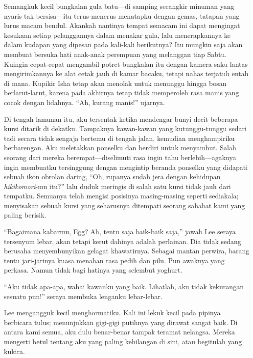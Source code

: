 \documentclass[smalldemyvopaper,11pt,twoside,onecolumn,openright,extrafontsizes]{memoir}
\begin{document}

Semangkuk kecil bungkalan gula batu---di samping secangkir minuman yang nyaris tak bersisa---itu terus-menerus menatapku dengan gemas, tatapan yang lurus macam bendul. Akankah nantinya tempat semacam ini dapat mengingat kesukaan setiap pelanggannya dalam menakar gula, lalu menerapkannya ke dalam kudapan yang dipesan pada kali-kali berikutnya? Itu mungkin saja akan membuat bersuka hati anak-anak perempuan yang melanggan tiap Sabtu. Kuingin cepat-cepat mengambil potret bungkalan itu dengan kamera saku lantas mengirimkannya ke alat cetak jauh di kamar bacaku, tetapi nahas terjatuh entah di mana. Kupikir Isha tetap akan menolak untuk menunggu hingga bosan berlarut-larut, karena pada akhirnya tetap tidak memperoleh rasa manis yang cocok dengan lidahnya. ``Ah, kurang manis!'' ujarnya.


Di tengah lamunan itu, aku tersentak ketika mendengar bunyi decit beberapa kursi ditarik di dekatku. Tampaknya kawan-kawan yang kutunggu-tunggu sedari tadi secara tidak sengaja bertemu di tengah jalan, kemudian menghampiriku berbarengan. Aku meletakkan ponselku dan berdiri untuk menyambut. Salah seorang dari mereka berempat---diselimuti rasa ingin tahu berlebih---agaknya ingin membuatku tersinggung dengan mengintip beranda ponselku yang didapati sebuah ikon obrolan daring, ``Oh, rupanya sudah jera dengan kehidupan \textit{hikikomori}-mu itu?'' lalu duduk meringis di salah satu kursi tidak jauh dari tempatku. Semuanya telah mengisi posisinya masing-masing seperti sediakala; menyisakan sebuah kursi yang seharusnya ditempati seorang sahabat kami yang paling berisik.

``Bagaimana kabarmu, Egg? Ah, tentu saja baik-baik saja,'' jawab Lee seraya tersenyum lebar, akan tetapi kerut dahinya adalah perlainan. Dia tidak sedang berusaha menyembunyikan gelagat khawatirnya. Sebagai mantan perwira, barang tentu jari-jarinya kuasa menahan rasa pedih dan pilu. Pun awaknya yang perkasa. Namun tidak bagi hatinya yang selembut yoghurt.

``Aku tidak apa-apa, wahai kawanku yang baik. Lihatlah, aku tidak kekurangan sesuatu pun!'' seraya membuka lenganku lebar-lebar.

Lee mengangguk kecil menghormatiku. Kali ini lekuk kecil pada pipinya berbicara tulus; menunjukkan gigi-gigi putihnya yang dirawat sangat baik. Di antara kami semua, aku dulu benar-benar tampak teramat nelangsa. Mereka mengerti betul tentang aku yang paling kehilangan di sini, atau begitulah yang kukira.
\end{document}
